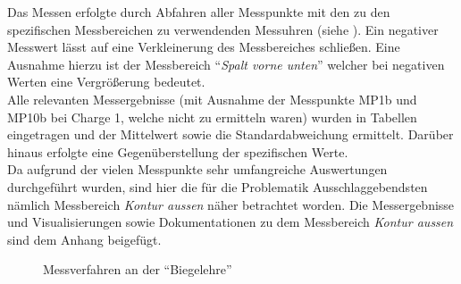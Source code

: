 \documentclass[12pt,a4paper,parskip]{scrartcl}
\begin{document}
 
 
 
Das Messen erfolgte durch Abfahren aller Messpunkte mit den zu den spezifischen Messbereichen zu verwendenden Messuhren (siehe ). Ein negativer Messwert lässt auf eine Verkleinerung des Messbereiches schließen. Eine Ausnahme hierzu ist der Messbereich "`\emph{Spalt vorne unten}"' welcher  bei negativen Werten eine Vergrößerung bedeutet.\\
 Alle relevanten Messergebnisse (mit Ausnahme der Messpunkte MP1b und MP10b bei Charge 1, welche nicht zu ermitteln waren) wurden in Tabellen eingetragen und  der Mittelwert sowie die Standardabweichung
 ermittelt. Darüber hinaus erfolgte eine Gegenüberstellung der spezifischen Werte.\\
Da aufgrund der vielen Messpunkte  sehr umfangreiche Auswertungen durchgeführt wurden,  sind hier die für die Problematik Ausschlaggebendsten nämlich Messbereich \emph{Kontur aussen} näher betrachtet worden. Die Messergebnisse und Visualisierungen sowie Dokumentationen zu dem Messbereich \emph{Kontur aussen} sind dem Anhang beigefügt. 
\begin{figure}[hbtp]
\centering
\hfill
{}
\hfill
{}
\hfill
\caption{Messverfahren an der "`Biegelehre"' }
\label{fig:messverfahren}
\end{figure}
\end{document}
